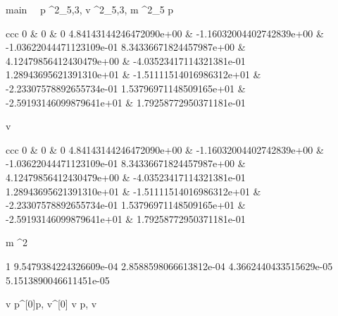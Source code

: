 \documentclass[12pt,a4paper]{book}
\begin{document}
\begin{eqcode}{main}{\ }{\ }{}
    p \in {}^2_{5,3},
    v \in {}^2_{5,3},
    m \in {}^2_{5} \lend
    p \gets \begin{tmatrix}{ccc}
            0 & 0 & 0 \lend
            4.84143144246472090e+00 & -1.16032004402742839e+00 &
            -1.03622044471123109e-01 \lend
            8.34336671824457987e+00 & 4.12479856412430479e+00 &
            -4.03523417114321381e-01 \lend
            1.28943695621391310e+01 & -1.51111514016986312e+01 &
            -2.23307578892655734e-01 \lend
            1.53796971148509165e+01 & -2.59193146099879641e+01 &
            1.79258772950371181e-01 \lend 
        \end{tmatrix} \lend
    v  \cdot
        \begin{tmatrix}{ccc}
            0 & 0 & 0 \lend
            4.84143144246472090e+00 & -1.16032004402742839e+00 &
            -1.03622044471123109e-01 \lend
            8.34336671824457987e+00 & 4.12479856412430479e+00 &
            -4.03523417114321381e-01 \lend
            1.28943695621391310e+01 & -1.51111514016986312e+01 &
            -2.23307578892655734e-01 \lend
            1.53796971148509165e+01 & -2.59193146099879641e+01 &
            1.79258772950371181e-01 \lend 
        \end{tmatrix} \lend
    m  \cdot \pi^2 \cdot 
        \begin{tvector}
            1 \lend
            9.5479384224326609e-04 \lend
            2.8588598066613812e-04 \lend
            4.3662440433515629e-05 \lend
            5.1513890046611451e-05 \lend
        \end{tvector} \lend
    v \gets {} \lend
    p^{[0]}\gets p, v^{[0]} \gets v \lend
    p, v \gets {} \lend
     \lend
\end{eqcode}
\end{document}
